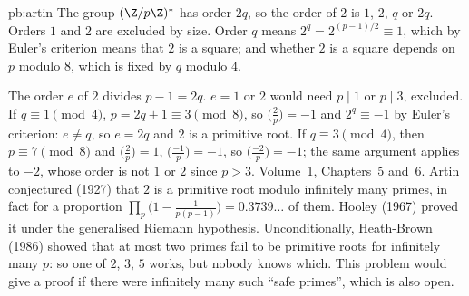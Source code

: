 \begin{solution}{pb:artin}
\idea The group $(\Z/p\Z)^*$ has order $2q$, so the order of $2$ is $1$, $2$, $q$ or $2q$. Orders $1$ and $2$ are excluded by size. Order
$q$ means $2^q=2^{(p-1)/2}\equiv1$, which by Euler's criterion means that $2$ is a square; and whether $2$ is a square depends on $p$
modulo $8$, which is fixed by $q$ modulo $4$.

\writeup The order $e$ of $2$ divides $p-1=2q$. $e=1$ or $2$ would need $p\mid1$ or $p\mid3$, excluded. If $q\equiv1\pmod4$, $p=2q+1\equiv3\pmod8$,
so $\bigl(\frac2p\bigr)=-1$ and $2^q\equiv-1$ by Euler's criterion: $e\ne q$, so $e=2q$ and $2$ is a primitive root. If $q\equiv3\pmod4$, then
$p\equiv7\pmod8$ and $\bigl(\frac2p\bigr)=1$, $\bigl(\frac{-1}p\bigr)=-1$, so $\bigl(\frac{-2}p\bigr)=-1$; the same argument applies to $-2$, whose order is
not $1$ or $2$ since $p>3$.
\tools Volume~1, Chapters~5 and~6.
\leads Artin conjectured (1927) that $2$ is a primitive root modulo infinitely many primes, in fact for a proportion $\prod_p\bigl(1-\frac1{p(p-1)}\bigr)
=0.3739\ldots$ of them. Hooley (1967) proved it under the generalised Riemann hypothesis. Unconditionally, Heath-Brown (1986) showed that at most two
primes fail to be primitive roots for infinitely many $p$: so one of $2$, $3$, $5$ works, but nobody knows which. This problem would
give a proof if there were infinitely many such ``safe primes'', which is also open.
\end{solution}

